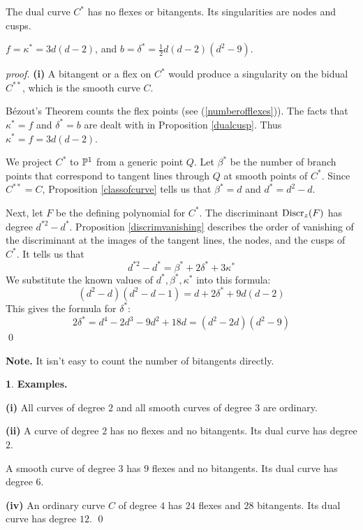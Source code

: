 \documentclass[leqno]{book}
\newcommand\Marginnote[1]{\marginnote{\hspace{-12pt}\normalfont{#1}}}
\theoremstyle{definition}%
\numberwithin{equation}{section}
\newtheorem{examples}[equation]{}
\theoremstyle{theorem} %
\renewenvironment{proof}{\no \emph{proof.}}{}
\begin{document}
 The dual curve $C^*$ has no flexes or bitangents.  Its
singularities are nodes and cusps.

 $f = \kappa^* = 3d(d-2)$,\; and 
\; $b = \delta^* =  \textstyle{\frac 1 2}d(d-2)(d^2-9)$.
\label{plform}


\begin{proof}  {\bf (i)} 
A bitangent or a flex on $C^*$  would produce a
singularity on the bidual $C^{**}$, which is the smooth curve $C$.

 B\'ezout's Theorem
counts the flex points (see (\ref{numberofflexes})).
The facts that $\kappa^*=f$ and $\delta^*=b$ are
dealt with in Proposition \ref{dualcusp}.    Thus $\kappa^* = f=
3d(d-2)$.

We project $C^*$ to $\mathbb{P}^1$ from a generic point $Q$.  Let $\beta^*$
be the number of branch points that correspond to tangent lines
through $Q$ at smooth points of $C^*$.  Since $C^{**}=C$, Proposition
\ref{classofcurve} tells us that $\beta^* = d$ and $d^* = d^2-d$.

Next, let $F$ be the defining polynomial for $C^*$.   The discriminant
$\operatorname{Discr}_z(F)$ has degree
$d^{*2}-d^*$.  Proposition \ref{discrimvanishing} describes the order
of vanishing of the discriminant at the images of the tangent lines,
the nodes, and the cusps of $C^*$.  It tells us that
$$d^{*2}- d^* = \beta^* + 2\delta^* + 3\kappa^*$$  We substitute 
the known values of $d^*, \beta^*,\kappa^*$ into this formula:
$$(d^2-d)(d^2-d-1) = d +2\delta^* +9d(d-2)$$
This gives the formula for $\delta^*$:
$$2\delta^* = d^4 - 2d^3 -9d^2+18d = (d^2-2d)(d^2-9)$$
\qed\end{proof}

\no
{\bf Note.}  It isn't easy to count the number of bitangents directly.



\begin{examples}{\bf Examples.}\Marginnote{somepluckerformulas}\;\,

\no
{\bf (i)} All
curves of degree $2$ and all smooth curves of degree $3$ are ordinary.

\no
{\bf (ii)} A curve of degree $2$ has no flexes and
no bitangents. Its dual curve has degree $2$.

 A smooth curve of degree $3$ has $9$ flexes and no
bitangents.  Its dual curve has degree $6$.

\no
{\bf (iv)} An ordinary curve $C$ of degree $4$ has $24$ flexes and $28$
bitangents.  Its dual curve has degree $12$. \qed
\label{somepluckerformulas} \end{examples}
\end{document}
